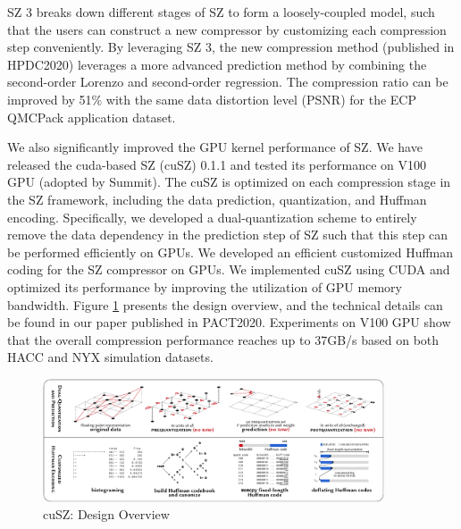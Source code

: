SZ 3 breaks down different stages of SZ to form a loosely-coupled model, such that the users can construct a new compressor by customizing each compression step conveniently. By leveraging SZ 3, the new compression method (published in HPDC2020) leverages a more advanced prediction method by combining the second-order Lorenzo and second-order regression. %
The compression ratio can be improved by 51\% with the same data distortion level (PSNR) for the ECP QMCPack application dataset.  


We also significantly improved the GPU kernel performance of SZ. We have released the cuda-based SZ (cuSZ) 0.1.1 and tested its performance on V100 GPU (adopted by Summit). The cuSZ is optimized on each compression stage in the SZ framework, including the data prediction, quantization, and Huffman encoding. Specifically, we developed a dual-quantization scheme to entirely remove the data dependency in the prediction step of SZ such that this step can be performed efficiently on GPUs. We developed an efficient customized Huffman coding for the SZ compressor on GPUs. We implemented cuSZ using CUDA and optimized its performance by improving the utilization of GPU memory bandwidth. Figure \ref{fig:cuSZ:arch} presents the design overview, and the technical details can be found in our paper published in PACT2020. Experiments on V100 GPU show that the overall compression performance reaches up to 37GB/s based on both HACC and NYX simulation datasets.

\begin{figure}
  \includegraphics[width=0.9\textwidth]{projects/2.3.4-DataViz/2.3.4.14-VeloC-SZ/200718_workflow.pdf}
  \caption{cuSZ: Design Overview}%
  \label{fig:cuSZ:arch}%
  \vspace{-2mm}
\end{figure}

